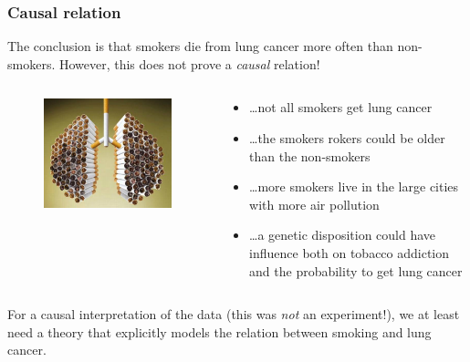 \documentclass{beamer}
\begin{document}
\begin{frame}
  \frametitle{Causal relation}
  
  The conclusion is that smokers die from lung cancer more often than non-smokers. However, this does not prove a \emph{causal} relation!
  
  \begin{columns}
    \begin{column}{0.3 \textwidth}
  
      \begin{figure}
        \centering
          \includegraphics[width=1.00\textwidth]{img/les-6-smoking2.jpg}
      \end{figure}
  
    \end{column}
    \begin{column}{0.7 \textwidth}
  
      \begin{itemize}
        \item \dots not all smokers get lung cancer
        \item \dots the smokers rokers could be older than the non-smokers
        \item \dots more smokers live in the large cities with more air pollution
        \item \dots a genetic disposition could have influence both on tobacco addiction and the probability to get lung cancer
      \end{itemize}
    
    \end{column}
  \end{columns}

  For a causal interpretation of the data (this was \emph{not} an experiment!), we at least need a theory that explicitly models the relation between smoking and lung cancer.
\end{frame}
\end{document}
